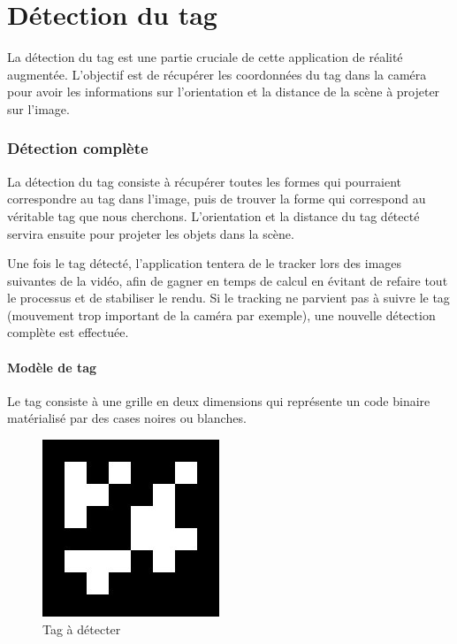 \part{Détection du tag}

La détection du tag est une partie cruciale de cette application de réalité augmentée. L'objectif est de récupérer les coordonnées du tag dans la caméra pour avoir les informations sur l'orientation et la distance de la scène à projeter sur l'image.

    \section{Détection complète}

    La détection du tag consiste à récupérer toutes les formes qui pourraient correspondre au tag dans l'image, puis de trouver la forme qui correspond au véritable tag que nous cherchons. L'orientation et la distance du tag détecté servira ensuite pour projeter les objets dans la scène.

    Une fois le tag détecté, l'application tentera de le tracker lors des images suivantes de la vidéo, afin de gagner en temps de calcul en évitant de refaire tout le processus et de stabiliser le rendu. Si le tracking ne parvient pas à suivre le tag (mouvement trop important de la caméra par exemple), une nouvelle détection complète est effectuée.

        \subsection{Modèle de tag}

        Le tag consiste à une grille en deux dimensions qui représente un code binaire matérialisé par des cases noires ou blanches.

        \begin{figure}[!h]
            \centering
            \includegraphics[scale=0.25]{img/marker.jpeg}
            \caption{Tag à détecter}
        \end{figure}


